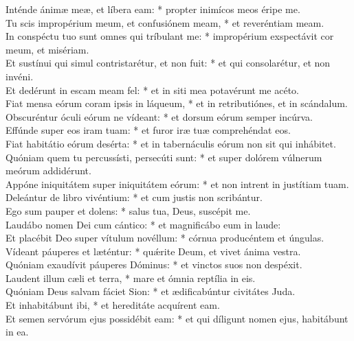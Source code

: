 {	Inténde ánimæ meæ, et líbera eam: * propter inimícos meos éripe me. \\
	Tu scis impropérium meum, et confusiónem meam, * et reveréntiam meam. \\
	In conspéctu tuo sunt omnes qui tríbulant me: * impropérium exspectávit cor meum, et misériam. \\
	Et sustínui qui simul contristarétur, et non fuit: * et qui consolarétur, et non invéni. \\
	Et dedérunt in escam meam fel: * et in siti mea potavérunt me acéto. \\
	Fiat mensa eórum coram ipsis in láqueum, * et in retributiónes, et in scándalum. \\
	Obscuréntur óculi eórum ne vídeant: * et dorsum eórum semper incúrva. \\
	Effúnde super eos iram tuam: * et furor iræ tuæ comprehéndat eos. \\
	Fiat habitátio eórum desérta: * et in tabernáculis eórum non sit qui inhábitet. \\
	Quóniam quem tu percussísti, persecúti sunt: * et super dolórem vúlnerum meórum addidérunt. \\
	Appóne iniquitátem super iniquitátem eórum: * et non intrent in justítiam tuam. \\
	Deleántur de libro vivéntium: * et cum justis non scribántur. \\
	Ego sum pauper et dolens: * salus tua, Deus, suscépit me. \\
	Laudábo nomen Dei cum cántico: * et magnificábo eum in laude: \\
	Et placébit Deo super vítulum novéllum: * córnua producéntem et úngulas. \\
	Vídeant páuperes et læténtur: * quǽrite Deum, et vivet ánima vestra. \\
	Quóniam exaudívit páuperes Dóminus: * et vinctos suos non despéxit. \\
	Laudent illum cæli et terra, * mare et ómnia reptília in eis. \\
	Quóniam Deus salvam fáciet Sion: * et ædificabúntur civitátes Juda. \\
	Et inhabitábunt ibi, * et hereditáte acquírent eam. \\
	Et semen servórum ejus possidébit eam: * et qui díligunt nomen ejus, habitábunt in ea. \\
}

